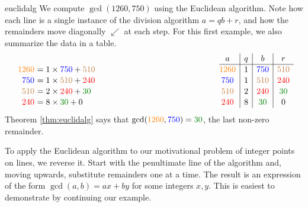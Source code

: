 
\begin{example}{}{euclidalg}
	We compute $\gcd(1260,750)$ using the Euclidean algorithm. Note how each line is a single instance of the division algorithm $a=qb+r$, and how the remainders move diagonally $\swarrow$ at each step. For this first example, we also summarize the data in a table.
	\[
		\renewcommand{\arraystretch}{1.1}
		\begin{array}{r@{\,\,}l@{\hspace{150pt}}c|c|c|c}
			& & a & q & b & r \\\cline{3-6}
			\textcolor{orange}{1260} & =1\times\textcolor{blue}{750}+\textcolor{brown}{510} & \textcolor{orange}{1260}& 1 & \textcolor{blue}{750} & \textcolor{brown}{510}\\
			\textcolor{blue}{750} & =1\times\textcolor{brown}{510}+\textcolor{red}{240} & \textcolor{blue}{750}& 1 & \textcolor{brown}{510} & \textcolor{red}{240}\\
			\textcolor{brown}{510} & =2\times\textcolor{red}{240}+\textcolor{Green}{30} & \textcolor{brown}{510} & 2 & \textcolor{red}{240} & \textcolor{Green}{30}\\
			\textcolor{red}{240} & =8\times\textcolor{Green}{30}+0 & \textcolor{red}{240} & 8 & \textcolor{Green}{30} & 0
		\end{array}
	\]
	Theorem \ref{thm:euclidalg} says that $\gcd(\textcolor{orange}{1260},\textcolor{blue}{750})=\textcolor{Green}{30}$, the last non-zero remainder.
\end{example}

\goodbreak



To apply the Euclidean algorithm to our motivational problem of integer points on lines, we reverse it. Start with the penultimate line of the algorithm and, moving upwards, substitute remainders one at a time. The result is an expression of the form $\gcd(a,b)=ax+by$ for some integers $x,y$. This is easiest to demonstrate by continuing our example.

